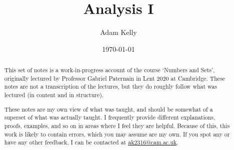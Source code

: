 \documentclass[a4paper]{scrreprt}
\title{Analysis I}
\author{Adam Kelly}
\date{\today}
\begin{document}
\maketitle

\begin{abstract}
	

	This set of notes is a work-in-progress account of the course `Numbers and Sets', originally lectured by Professor Gabriel Paternain in Lent 2020 at Cambridge. These notes are not a transcription of the lectures, but they do roughly follow what was lectured (in content and in structure).

	These notes are my own view of what was taught, and should be somewhat of a superset of what was actually taught. I frequently provide different explanations, proofs, examples, and so on in areas where I feel they are helpful. Because of this, this work is likely to contain errors, which you may assume are my own. If you spot any or have any other feedback, I can be contacted at \href{mailto:ak2316@cam.ac.uk}{ak2316@cam.ac.uk}.



\end{abstract}

\tableofcontents

\clearpage




\end{document}
